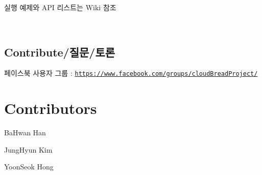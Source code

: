 실행 예제와 A\+PI 리스트는 Wiki 참조

~\newline
 \subsection*{Contribute/질문/토론}

페이스북 사용자 그룹 \+: \href{https://www.facebook.com/groups/cloudBreadProject/}{\tt https\+://www.\+facebook.\+com/groups/cloud\+Bread\+Project/}

\section*{Contributors}


\begin{DoxyItemize}
\item Ba\+Hwan Han
\item Jung\+Hyun Kim
\item Yoon\+Seok Hong 
\end{DoxyItemize}